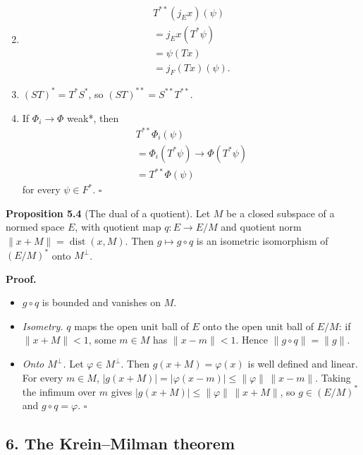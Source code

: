 \documentclass[
  english,
  11pt,
  a4paper,
]{article}
\providecommand{\tightlist}{%
  \setlength{\itemsep}{0pt}\setlength{\parskip}{0pt}}
\begin{document}
\begin{enumerate}
\setcounter{enumi}{1}
\item
  \[\begin{gathered}
  T^{**}(j_Ex)(\psi)\\
  =j_Ex(T^*\psi)\\
  =\psi(Tx)\\
  =j_F(Tx)(\psi).
  \end{gathered}\]
\item
  \((ST)^*=T^*S^*\), so \((ST)^{**}=S^{**}T^{**}\).
\item
  If \(\Phi_i\to\Phi\) weak*, then \[\begin{gathered}
  T^{**}\Phi_i(\psi)\\
  =\Phi_i(T^*\psi)\to\Phi(T^*\psi)\\
  =T^{**}\Phi(\psi)
  \end{gathered}\] for every \(\psi\in F^*\). \(\square\)
\end{enumerate}

\textbf{Proposition 5.4} (The dual of a quotient). Let \(M\) be a closed
subspace of a normed space \(E\), with quotient map \(q:E\to E/M\) and
quotient norm \(\|x+M\|=\operatorname{dist}(x,M)\). Then
\(g\mapsto g\circ q\) is an isometric isomorphism of \((E/M)^*\) onto
\(M^\perp\).

\textbf{Proof.}

\begin{itemize}
\tightlist
\item
  \(g\circ q\) is bounded and vanishes on \(M\).
\item
  \emph{Isometry.} \(q\) maps the open unit ball of \(E\) onto the open
  unit ball of \(E/M\): if \(\|x+M\|<1\), some \(m\in M\) has
  \(\|x-m\|<1\). Hence \(\|g\circ q\|=\|g\|\).
\item
  \emph{Onto \(M^\perp\).} Let \(\varphi\in M^\perp\). Then
  \(g(x+M)=\varphi(x)\) is well defined and linear. For every
  \(m\in M\), \(|g(x+M)|=|\varphi(x-m)|\le\|\varphi\|\,\|x-m\|\). Taking
  the infimum over \(m\) gives \(|g(x+M)|\le\|\varphi\|\,\|x+M\|\), so
  \(g\in(E/M)^*\) and \(g\circ q=\varphi\). \(\square\)
\end{itemize}

\subsection[6. The Krein--Milman
theorem]{\texorpdfstring{\protect\hypertarget{weak-topologies-tychonoff-banach-alaoglu-mazur-bipolars-krein-milman-and-eberlein-smulian--oa-fnd-wt-06}{}{}6.
The Krein--Milman
theorem}{6. The Krein--Milman theorem}}\label{weak-topologies-tychonoff-banach-alaoglu-mazur-bipolars-krein-milman-and-eberlein-smulian--OA-FND-WT-06}
\end{document}

